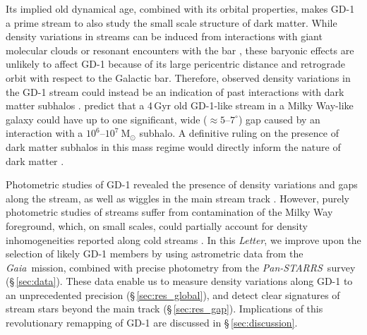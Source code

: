 \documentclass[modern]{aastex62}
\newcommand{\acronym}[1]{{\small{#1}}}
\newcommand{\gaia}{\textsl{Gaia}}
\newcommand{\pans}{\textsl{Pan-STARRS}}
\newcommand{\DR}{\acronym{DR2}}
\newcommand{\msun}{\textrm{M}_\odot}
\newcommand{\article}{\textsl{Letter}}
\newcommand{\todo}[1]{{\color{red} TODO: #1}}
\begin{document}
Its implied old dynamical age, combined with its orbital properties, makes GD-1
a prime stream to also study the small scale structure of dark matter.
While density variations in streams can be induced from interactions with giant
molecular clouds \citep{Amorisco:2016} or resonant encounters with the bar
\citep{Pearson:2017}, these baryonic effects are unlikely to affect GD-1 because
of its large pericentric distance and retrograde orbit with respect to the
Galactic bar.
Therefore, observed density variations in the GD-1 stream could instead be an
indication of past interactions with dark matter subhalos
\citep[e.g.,][]{Ngan:2014}.
\citet{Erkal:2016} predict that a 4\,Gyr old GD-1-like stream in a Milky Way-like galaxy
could have up to one significant, wide
($\approx 5$--$7^\circ$) gap caused by an interaction with a
$10^6$--$10^7~\msun$ subhalo.
A definitive ruling on the presence of dark matter subhalos in this mass regime
would directly inform the nature of dark matter \citep[e.g.,][]{Bullock:2017}.

Photometric studies of GD-1 revealed the presence of density variations and gaps
along the stream, as well as wiggles in the main stream track
\citep[][]{Carlberg:2013, DeBoer:2018}.
However, purely photometric studies of streams suffer from contamination of the
Milky Way foreground, which, on small scales, could partially account for
density inhomogeneities reported along cold streams \citep[e.g.,][]{Ibata:2016}.
In this \article, we improve upon the selection of likely GD-1 members by using
astrometric data from the \gaia\ mission, combined with precise photometry from
the \pans\ survey (\S\,\ref{sec:data}).
These data enable us to measure density variations along GD-1 to an
unprecedented precision (\S\,\ref{sec:res_global}), and detect clear signatures
of stream stars beyond the main track (\S\,\ref{sec:res_gap}).
Implications of this revolutionary remapping of GD-1 are discussed in
\S\,\ref{sec:discussion}.
%
\end{document}
